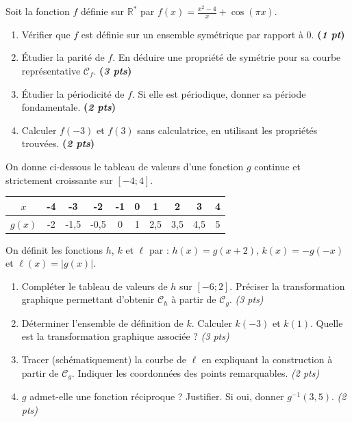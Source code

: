 \documentclass[11pt]{article}
\begin{document}
\begin{exercice}
Soit la fonction $f$ définie sur $\mathbb{R}^*$ par $f(x) = \frac{x^2 - 4}{x} + \cos(\pi x)$.
\begin{enumerate}
    \item Vérifier que $f$ est définie sur un ensemble symétrique par rapport à $0$. \hfill\textbf{(\textit{1 pt})}
    \item Étudier la parité de $f$. En déduire une propriété de symétrie pour sa courbe représentative $\mathcal{C}_f$. \hfill\textbf{(\textit{3 pts})}
    \item Étudier la périodicité de $f$. Si elle est périodique, donner sa période fondamentale. \hfill\textbf{(\textit{2 pts})}
    \item Calculer $f(-3)$ et $f(3)$ sans calculatrice, en utilisant les propriétés trouvées. \hfill\textbf{(\textit{2 pts})}
\end{enumerate}
\end{exercice}

\begin{exercice}
On donne ci-dessous le tableau de valeurs d'une fonction $g$ continue et strictement croissante sur $[-4; 4]$.
\begin{center}
\begin{tabular}{|c|c|c|c|c|c|c|c|c|c|}
\hline
$x$ & -4 & -3 & -2 & -1 & 0 & 1 & 2 & 3 & 4 \\ \hline
$g(x)$ & -2 & -1,5 & -0,5 & 0 & 1 & 2,5 & 3,5 & 4,5 & 5 \\ \hline
\end{tabular}
\end{center}
On définit les fonctions $h$, $k$ et $\ell$ par : $h(x) = g(x+2)$, $k(x) = -g(-x)$ et $\ell(x) = |g(x)|$.
\begin{enumerate}
    \item Compléter le tableau de valeurs de $h$ sur $[-6; 2]$. Préciser la transformation graphique permettant d'obtenir $\mathcal{C}_h$ à partir de $\mathcal{C}_g$. \hfill\textit{(3 pts)}
    \item Déterminer l'ensemble de définition de $k$. Calculer $k(-3)$ et $k(1)$. Quelle est la transformation graphique associée ? \hfill\textit{(3 pts)}
    \item Tracer (schématiquement) la courbe de $\ell$ en expliquant la construction à partir de $\mathcal{C}_g$. Indiquer les coordonnées des points remarquables. \hfill\textit{(2 pts)}
    \item $g$ admet-elle une fonction réciproque ? Justifier. Si oui, donner $g^{-1}(3,5)$. \hfill\textit{(2 pts)}
\end{enumerate}
\end{exercice}
\end{document}
